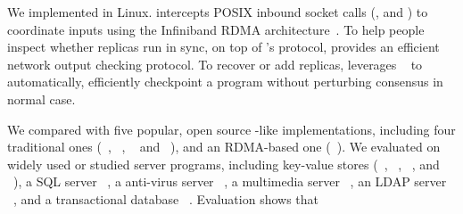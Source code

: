


We implemented \xxx in Linux. \xxx intercepts POSIX inbound socket calls
(\eg, \accept and \recv) to coordinate inputs using the Infiniband
RDMA architecture~\cite{infiniband}. To help people inspect whether replicas 
run in sync, on top of \xxx's \paxos protocol, \xxx provides an efficient 
network output checking protocol. To recover or add replicas, \xxx 
leverages \criu~\cite{criu} to automatically, efficiently checkpoint a program 
without perturbing consensus in normal case.


We compared \xxx with five popular, open source \paxos-like implementations,
including four traditional ones (\libpaxos~\cite{libpaxos},
\zookeeper~\cite{zookeeper}, \crane~\cite{crane:sosp15} and
\spaxos~\cite{spaxos:srds12}), and an RDMA-based one 
(\dare~\cite{dare:hpdc15}). We evaluated \xxx on \nprog widely used or studied 
server programs, including
\nkvprog key-value stores (\redis~\cite{redis}, \memcached~\cite{memcached},
\ssdb~\cite{ssdb}, and \mongodb~\cite{mongodb}), a SQL server
\mysql~\cite{mysql}, a anti-virus server \clamav~\cite{clamav}, a multimedia
server \mediatomb~\cite{mediatomb}, an LDAP server \openldap~\cite{openldap}, 
and a transactional database \calvin~\cite{calvin:sigmod12}. Evaluation shows 
that

